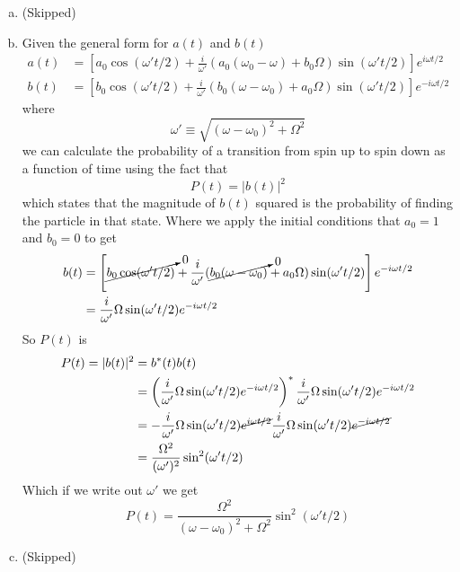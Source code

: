\documentclass[11pt]{article}
\numberwithin{equation}{section}
\begin{document}
\begin{enumerate}[(a)]
\item (Skipped)

\item 
Given the general form for $a(t)$ and $b(t)$
\begin{align*}
a(t) &= \left[a_0\cos(\omega' t/2)+\frac{i}{\omega '}(a_0(\omega_0-\omega)+b_0\Omega)\sin(\omega 't/2)\right]e^{i\omega t/2}\\
b(t) &= \left[b_0\cos(\omega' t/2)+\frac{i}{\omega '}(b_0(\omega-\omega_0)+a_0\Omega)\sin(\omega 't/2)\right]e^{-i\omega t/2}
\end{align*}
where 
$$\omega'\equiv\sqrt{(\omega-\omega_0)^2+\Omega^2}$$
we can calculate the probability of a transition from spin up to spin down as a function of time using the fact that
$$P(t) = |b(t)|^2$$
which states that the magnitude of $b(t)$ squared is the probability of finding the particle in that state. Where we apply the initial conditions that $a_0 = 1$ and $b_0 = 0$ to get
\begin{align*}
b(t) &= \left[\cancelto{0}{b_0\cos(\omega' t/2)}+\frac{i}{\omega '}(\cancelto{0}{b_0(\omega-\omega_0)}+a_0\Omega)\sin(\omega 't/2)\right]e^{-i\omega t/2}\\
&= \frac{i}{\omega '}\Omega\sin(\omega 't/2)e^{-i\omega t/2}
\end{align*}
So $P(t)$ is
\begin{align*}
P(t) = |b(t)|^2 &= b^*(t)b(t)\\
&= \left(\frac{i}{\omega '}\Omega\sin(\omega 't/2)e^{-i\omega t/2}\right)^*\frac{i}{\omega '}\Omega\sin(\omega 't/2)e^{-i\omega t/2}\\
&= -\frac{i}{\omega '}\Omega\sin(\omega 't/2)\cancel{e^{i\omega t/2}}\frac{i}{\omega '}\Omega\sin(\omega 't/2)\cancel{e^{-i\omega t/2}}\\
&= \frac{\Omega^2}{(\omega ')^2}\sin^2(\omega 't/2)
\end{align*}
Which if we write out $\omega'$ we get
$$P(t) = \frac{\Omega^2}{(\omega-\omega_0)^2+\Omega^2}\sin^2(\omega 't/2)$$



\item (Skipped)


\end{enumerate}
\end{document}
